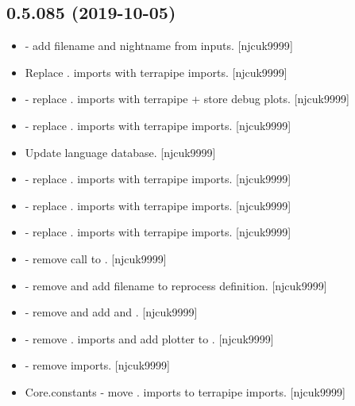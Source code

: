 \documentclass[a4paper,10pt,english]{report}
\begin{document}
\subsection{0.5.085 (2019-10-05)}
\label{\detokenize{misc/changelog:id57}}\begin{itemize}
\item {} 
 - add filename and nightname from
inputs. {[}njcuk9999{]}

\item {} 
Replace . imports with terrapipe imports. {[}njcuk9999{]}

\item {} 
 - replace . imports with terrapipe + store debug
plots. {[}njcuk9999{]}

\item {} 
 - replace . imports with terrapipe imports.
{[}njcuk9999{]}

\item {} 
Update language database. {[}njcuk9999{]}

\item {} 
 - replace . imports with terrapipe imports. {[}njcuk9999{]}

\item {} 
 - replace . imports with terrapipe imports.
{[}njcuk9999{]}

\item {} 
 - replace . imports with terrapipe imports. {[}njcuk9999{]}

\item {} 
 - remove call to
. {[}njcuk9999{]}

\item {} 
 - remove  and
add filename to reprocess definition. {[}njcuk9999{]}

\item {} 
 - remove  and add
 and . {[}njcuk9999{]}

\item {} 
 - remove . imports and add plotter to .
{[}njcuk9999{]}

\item {} 
 - remove imports. {[}njcuk9999{]}

\item {} 
Core.constants - move . imports to terrapipe imports. {[}njcuk9999{]}

\end{itemize}
\end{document}
